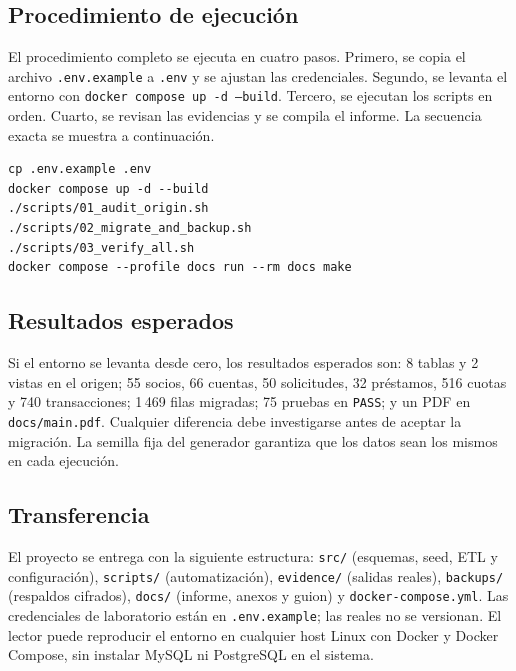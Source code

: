 \subsection{Procedimiento de ejecución}

El procedimiento completo se ejecuta en cuatro pasos. Primero, se copia el
archivo \texttt{.env.example} a \texttt{.env} y se ajustan las credenciales.
Segundo, se levanta el entorno con \texttt{docker compose up -d --build}.
Tercero, se ejecutan los scripts en orden. Cuarto, se revisan las evidencias y
se compila el informe. La secuencia exacta se muestra a continuación.

\begin{lstlisting}[style=terminal,caption={Secuencia de reproducción del proyecto},label={lst:reproduccion}]
cp .env.example .env
docker compose up -d --build
./scripts/01_audit_origin.sh
./scripts/02_migrate_and_backup.sh
./scripts/03_verify_all.sh
docker compose --profile docs run --rm docs make
\end{lstlisting}

\subsection{Resultados esperados}

Si el entorno se levanta desde cero, los resultados esperados son: 8 tablas y
2 vistas en el origen; 55 socios, 66 cuentas, 50 solicitudes, 32 préstamos,
516 cuotas y 740 transacciones; 1\,469 filas migradas; 75 pruebas en
\texttt{PASS}; y un PDF en \texttt{docs/main.pdf}. Cualquier diferencia debe
investigarse antes de aceptar la migración. La semilla fija del generador
garantiza que los datos sean los mismos en cada ejecución.

\subsection{Transferencia}

El proyecto se entrega con la siguiente estructura: \texttt{src/} (esquemas,
seed, ETL y configuración), \texttt{scripts/} (automatización),
\texttt{evidence/} (salidas reales), \texttt{backups/} (respaldos cifrados),
\texttt{docs/} (informe, anexos y guion) y \texttt{docker-compose.yml}. Las
credenciales de laboratorio están en \texttt{.env.example}; las reales no se
versionan. El lector puede reproducir el entorno en cualquier host Linux con
Docker y Docker Compose, sin instalar MySQL ni PostgreSQL en el sistema.
